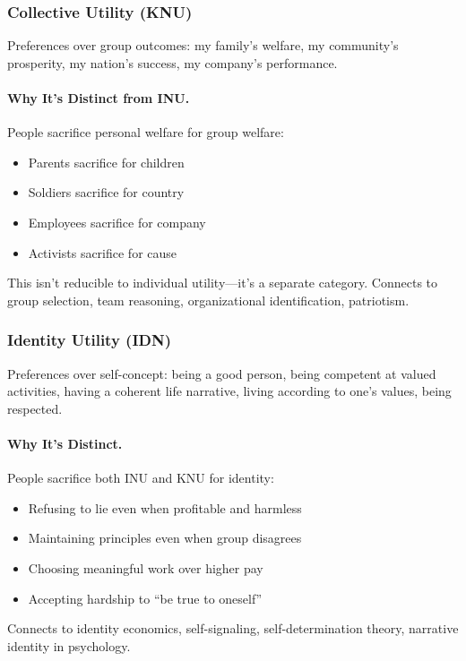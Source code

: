 \subsubsection{Collective Utility (KNU)}

Preferences over group outcomes: my family's welfare, my community's prosperity,
my nation's success, my company's performance.

\paragraph{Why It's Distinct from INU.}
People sacrifice personal welfare for group welfare:
\begin{itemize}
  \item Parents sacrifice for children
  \item Soldiers sacrifice for country
  \item Employees sacrifice for company
  \item Activists sacrifice for cause
\end{itemize}

This isn't reducible to individual utility---it's a separate category.
Connects to group selection, team reasoning, organizational identification, patriotism.

\subsubsection{Identity Utility (IDN)}

Preferences over self-concept: being a good person, being competent at valued activities,
having a coherent life narrative, living according to one's values, being respected.

\paragraph{Why It's Distinct.}
People sacrifice both INU and KNU for identity:
\begin{itemize}
  \item Refusing to lie even when profitable and harmless
  \item Maintaining principles even when group disagrees
  \item Choosing meaningful work over higher pay
  \item Accepting hardship to ``be true to oneself''
\end{itemize}

Connects to \citet{akerlofkranton} identity economics, \citet{benaboutirole} self-signaling,
self-determination theory, narrative identity in psychology.

